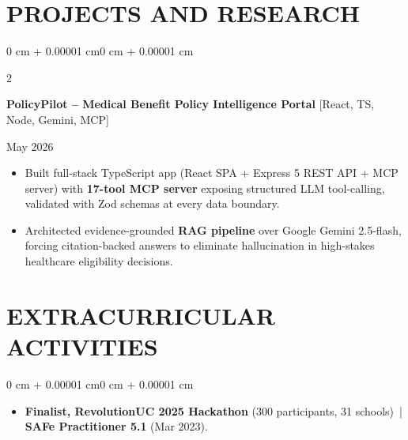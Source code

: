\documentclass[10pt, letterpaper]{article}
\newenvironment{highlights}{
    \begin{itemize}[
        topsep=0.10 cm,
        parsep=0.06 cm,
        partopsep=0pt,
        itemsep=0.06 cm,
        leftmargin=12pt
    ]
}{
    \end{itemize}
}
\newenvironment{onecolentry}{
    \begin{adjustwidth}{0 cm + 0.00001 cm}{0 cm + 0.00001 cm}
}{
    \end{adjustwidth}
}
\newenvironment{twocolentry}[2][]{
    \onecolentry
    \def\secondColumn{#2}
    \setcolumnwidth{\fill, 4.5 cm}
    \begin{paracol}{2}
}{
    \switchcolumn \raggedleft \secondColumn
    \end{paracol}
    \endonecolentry
}
\begin{document}
\section{PROJECTS AND RESEARCH}
\begin{twocolentry}{May 2026}
\textbf{PolicyPilot -- Medical Benefit Policy Intelligence Portal} [React, TS, Node, Gemini, MCP]
\end{twocolentry}
\begin{highlights}
  \item Built full-stack TypeScript app (React SPA + Express 5 REST API + MCP server) with \textbf{17-tool MCP server} exposing structured LLM tool-calling, validated with Zod schemas at every data boundary.
  \item Architected evidence-grounded \textbf{RAG pipeline} over Google Gemini 2.5-flash, forcing citation-backed answers to eliminate hallucination in high-stakes healthcare eligibility decisions.
\end{highlights}

\section{EXTRACURRICULAR ACTIVITIES}
\begin{onecolentry}
\begin{highlights}
  \item \textbf{Finalist, RevolutionUC 2025 Hackathon} (300 participants, 31 schools) \,|\, \textbf{SAFe Practitioner 5.1} (Mar 2023).
\end{highlights}
\end{onecolentry}
\end{document}
